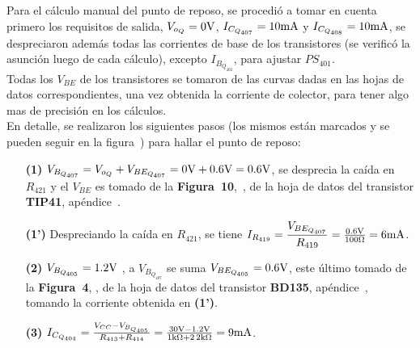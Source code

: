 \label{qpoint}

\begin{sloppypar}

Para el cálculo manual del punto de reposo, se procedió a tomar en cuenta primero los requisitos de salida, $V_{o_{Q}} = 0 \si[per-mode=symbol]{\volt}$, $I_{C_{Q_{407}}}=10 \si[per-mode=symbol]{\milli\ampere}$ y $I_{C_{Q_{408}}}=10 \si[per-mode=symbol]{\milli\ampere}$, se despreciaron además todas las corrientes de base de los transistores (se verificó la asunción luego de cada cálculo), excepto $I_{B_{Q_{402}}}$, para ajustar $PS_{401}$. \\
Todas los $V_{BE}$ de los transistores se tomaron de las curvas dadas en las hojas de datos correspondientes, una vez obtenida la corriente de colector, para tener algo mas de precisión en los cálculos.\\


En detalle, se realizaron los siguientes pasos (los mismos están marcados y se pueden seguir en la \mbox{figura~}) para hallar el punto de reposo:



\begin{enumerate}

\item[\textbf{(1)}] $V_{B_{Q_{407}}} =  V_{o_{Q}} + V_{BE_{Q_{407}}}  = 0 \si[per-mode=symbol]{\volt} + 0.6 \si[per-mode=symbol]{\volt} = 0.6 \si[per-mode=symbol]{\volt}$, se desprecia la caída en $R_{421}$ y el $V_{BE}$ es tomado de la \textbf{Figura~10},\, , de la hoja de datos del transistor \textbf{TIP41}, apéndice~.


\item[\textbf{(1')}] Despreciando la caída en $R_{421}$, se tiene $I_{R_{419}}=\dfrac{V_{BE_{Q_{407}}}}{R_{419}}=  \frac{0.6 \si[per-mode=symbol]{\volt}}{100 \si[per-mode=symbol]{\ohm}}  =6\si[per-mode=symbol]{\milli\ampere}$.


\item[\textbf{(2)}]  $V_{B_{Q_{405}}}=1.2 \si[per-mode=symbol]{\volt}$ , a $V_{B_{Q_{407}}}$ se suma $V_{BE_{Q_{405}}}=0.6 \si[per-mode=symbol]{\volt}$, este último tomado de la \textbf{Figura~4}, , de la hoja de datos del transistor \textbf{BD135}, apéndice~, tomando la corriente obtenida en \textbf{(1')}.


\item[\textbf{(3)}] $I_{C_{Q_{404}}} = \frac{V_{CC} - V_{B_{Q_{405}}}}{R_{413} + R_{414}} = \frac{30 \si[per-mode=symbol]{\volt} - 1.2 \si[per-mode=symbol]{\volt}}{1 \si[per-mode=symbol]{\kilo\ohm + 2.2 \si[per-mode=symbol]{\kilo\ohm}}} = 9 \si[per-mode=symbol]{\milli\ampere}$.



\end{enumerate}
\end{sloppypar}
